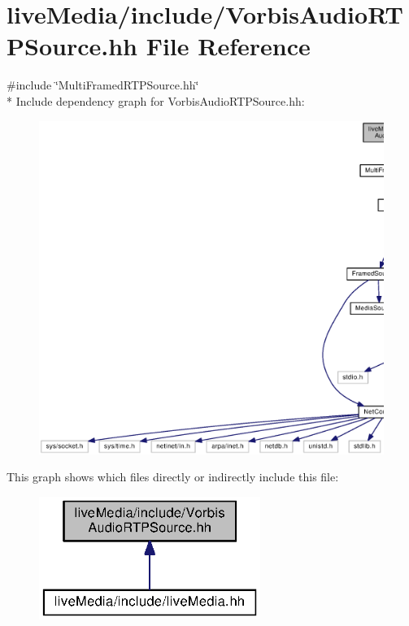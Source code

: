 \section{live\+Media/include/\+Vorbis\+Audio\+R\+T\+P\+Source.hh File Reference}
\label{VorbisAudioRTPSource_8hh}
{\ttfamily \#include \char`\"{}Multi\+Framed\+R\+T\+P\+Source.\+hh\char`\"{}}\\*
Include dependency graph for Vorbis\+Audio\+R\+T\+P\+Source.\+hh\+:
\nopagebreak
\begin{figure}[H]
\begin{center}
\leavevmode
\includegraphics[width=350pt]{VorbisAudioRTPSource_8hh__incl}
\end{center}
\end{figure}
This graph shows which files directly or indirectly include this file\+:
\nopagebreak
\begin{figure}[H]
\begin{center}
\leavevmode
\includegraphics[width=204pt]{VorbisAudioRTPSource_8hh__dep__incl}
\end{center}
\end{figure}
